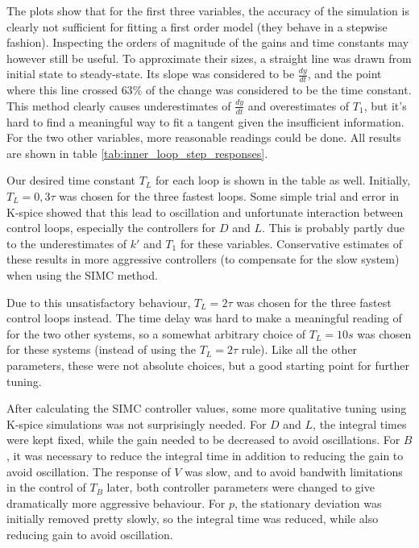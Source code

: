 \documentclass[12pt]{article}
\begin{document}
The plots show that for the first three variables, the accuracy of the simulation is clearly not sufficient for fitting a first order model (they behave in a stepwise fashion). Inspecting the orders of magnitude of the gains and time constants may however still be useful. To approximate their sizes, a straight line was drawn from initial state to steady-state. Its slope was considered to be $\frac{dy}{dt}$, and the point where this line crossed $63\%$ of the change was considered to be the time constant. This method clearly causes underestimates of $\frac{dy}{dt}$ and overestimates of $T_1$, but it's hard to find a meaningful way to fit a tangent given the insufficient information. For the two other variables, more reasonable readings could be done. All results are shown in table \ref{tab:inner_loop_step_responses}.

Our desired time constant $T_L$ for each loop is shown in the table as well. Initially, $T_L = 0,3\tau$ was chosen for the three fastest loops. Some simple trial and error in K-spice showed that this lead to oscillation and unfortunate interaction between control loops, especially the controllers for $D$ and $L$. This is probably partly due to the underestimates of $k'$ and $T_1$ for these variables. Conservative estimates of these results in more aggressive controllers (to compensate for the slow system) when using the SIMC method.

Due to this unsatisfactory behaviour, $T_L = 2\tau$ was chosen for the three fastest control loops instead. The time delay was hard to make a meaningful reading of for the two other systems, so a somewhat arbitrary choice of $T_L = 10s$ was chosen for these systems (instead of using the $T_L = 2\tau$ rule). Like all the other parameters, these were not absolute choices, but a good starting point for further tuning.

After calculating the SIMC controller values, some more qualitative tuning using K-spice simulations was not surprisingly needed. For $D$ and $L$, the integral times were kept fixed, while the gain needed to be decreased to avoid oscillations. For $B$, it was necessary to reduce the integral time in addition to reducing the gain to avoid oscillation. The response of $V$ was slow, and to avoid bandwith limitations in the control of $T_B$ later, both controller parameters were changed to give dramatically more aggressive behaviour. For $p$, the stationary deviation was initially removed pretty slowly, so the integral time was reduced, while also reducing gain to avoid oscillation.
\end{document}
